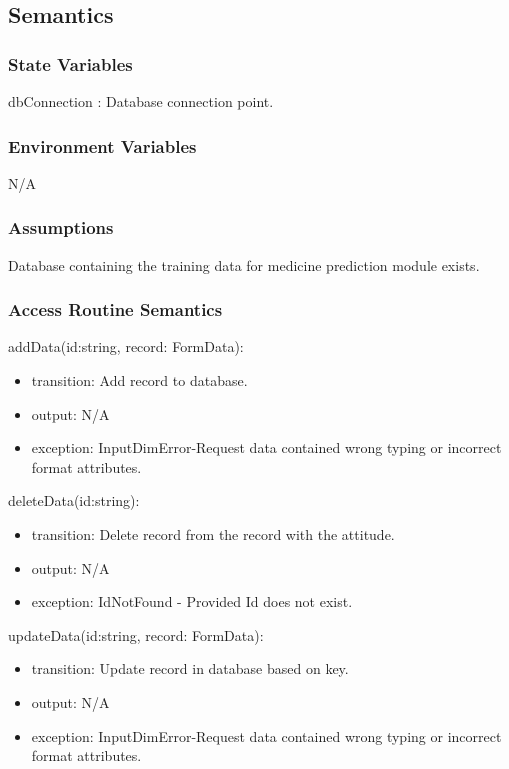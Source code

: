 \documentclass[12pt, titlepage]{article}
\begin{document}
\subsection{Semantics}

\subsubsection{State Variables}

dbConnection : Database connection point.

\subsubsection{Environment Variables}

N/A

\subsubsection{Assumptions}

Database containing the training data for medicine prediction module exists.

\subsubsection{Access Routine Semantics}

\noindent addData(id:string, record: FormData):
\begin{itemize}
\item transition: Add record to database.
\item output: N/A
\item exception: InputDimError-Request data contained wrong typing or incorrect format attributes.
\end{itemize}

\noindent deleteData(id:string):
\begin{itemize}
\item transition: Delete record from the record with the attitude.
\item output: N/A
\item exception: IdNotFound - Provided Id does not exist.
\end{itemize}

\noindent updateData(id:string, record: FormData):
\begin{itemize}
\item transition: Update record in database based on key.
\item output: N/A
\item exception: InputDimError-Request data contained wrong typing or incorrect format attributes.
\end{itemize}
\end{document}
